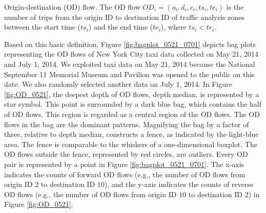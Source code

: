 \documentclass[a4paper,UKenglish]{lipics-v2018}
\begin{document}
\begin{definition}{Origin-destination (OD) flow.}
	The OD flow $OD_i = (o_i,d_i,c_i,ts_i, te_i)$ is the number of trips from the origin ID to destination ID of traffic analysis zones between the start time ($ts_i$) and the end time ($te_i$), where $ts_i<te_i$.
\end{definition}

Based on this basic definition, Figure \ref{fig:bagplot_0521_0701} depicts bag plots representing the OD flows of New York City taxi data collected on May 21, 2014 and July 1, 2014.
We exploited taxi data on May 21, 2014 because the National September 11 Memorial Museum and Pavilion was opened to the public on this date.
We also randomly selected another data on July 1, 2014.
In Figure \ref{fig:OD_0521}, the deepest depth of OD flows, depth median, is represented by a star symbol.
This point is surrounded by a dark blue bag, which contains the half of OD flows.
This region is regarded as a central region of the OD flows.
The OD flows in the bag are the dominant patterns.
Magnifying the bag by a factor of three, relative to depth median, constructs a fence, as indicated by the light-blue area.
The fence is comparable to the whiskers of a one-dimensional boxplot.
The OD flows outside the fence, represented by red circles, are outliers.
Every OD pair is represented by a point in Figure \ref{fig:bagplot_0521_0701}.
The x-axis indicates the counts of forward OD flows (e.g., the number of OD flows from origin ID $2$ to destination ID $10$), and the y-axis indicates the counts of reverse OD flows (e.g., the number of OD flows from origin ID $10$ to destination  ID $2$) in Figure \ref{fig:OD_0521}.
\end{document}
